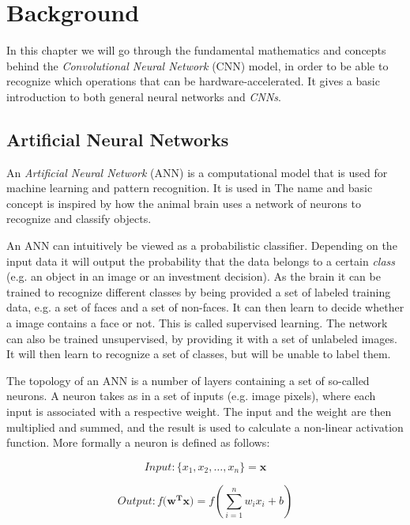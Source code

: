 \chapter{Background}

In this chapter we will go through the fundamental mathematics and concepts behind the \textit{Convolutional Neural Network} (CNN) model, in order to be able to recognize which operations that can be hardware-accelerated. It gives a basic introduction to both general neural networks and \textit{CNNs}.  

\section{Artificial Neural Networks}

An \textit{Artificial Neural Network} (ANN) is a computational model that is used for machine learning and pattern recognition. It is used in The name and basic concept is inspired by how the animal brain uses a network of neurons to recognize and classify objects. 

An ANN can intuitively be viewed as a probabilistic classifier. Depending on the input data it will output the probability that the data belongs to a certain \textit{class} (e.g. an object in an image or an investment decision). As the brain it can be trained to recognize different classes by being provided a set of labeled training data, e.g. a set of faces and a set of non-faces. It can then learn to decide whether a image contains a face or not. This is called supervised learning. The network can also be trained unsupervised, by providing it with a set of unlabeled images. It will then learn to recognize a set of classes, but will be unable to label them.  

The topology of an ANN is a number of layers containing a set of so-called neurons. A neuron takes as in a set of inputs (e.g. image pixels), where each input is associated with a respective weight. The input and the weight are then multiplied and summed, and the result is used to calculate a non-linear activation function. More formally a neuron is defined as follows: 

\begin{equation*}
Input: \{x_1, x_2,\dots, x_n\} = \mathbf{x} 
\end{equation*}

\begin{equation*}
Output: f(\mathbf{w^{T}x)} = f(\sum_{i=1}^{n}w_i x_i + b)
\end{equation*}

